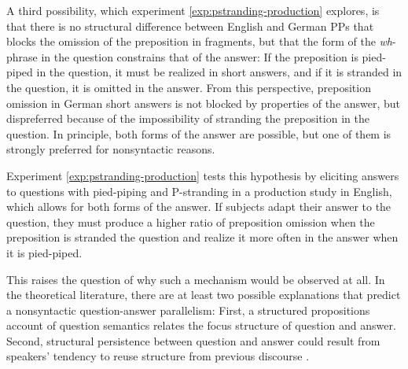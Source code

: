 A third possibility, which experiment \ref{exp:pstranding-production} explores, is that there is no structural difference between English and German PPs that blocks the omission of the preposition in fragments, but that the form of the \textit{wh}-phrase in the question constrains that of the answer: If the preposition is pied-piped in the question, it must be realized in short answers, and if it is stranded in the question, it is omitted in the answer. From this perspective, preposition omission in German short answers is not blocked by properties of the answer, but dispreferred because of the impossibility of stranding the preposition in the question. In principle, both forms of the answer are possible, but one of them is strongly preferred for nonsyntactic reasons.

\noindent Experiment \ref{exp:pstranding-production} tests this hypothesis by eliciting answers to questions with pied-piping and P-stranding in a production study in English, which allows for both forms of the answer. If subjects adapt their answer to the question, they must produce a higher ratio of preposition omission when the preposition is stranded the question and realize it more often in the answer when it is pied-piped.

This raises the question of why such a mechanism would be observed at all. In the theoretical literature, there are at least two possible explanations that predict a nonsyntactic question-answer parallelism: First, a structured propositions account of question semantics \citep{vonstechow1981, reich2002a} relates the focus structure of question and answer. Second, structural persistence \citep{nykiel2017} between question and answer could result from speakers' tendency to reuse structure from previous discourse \citep{levelt.kelter1982, nykiel2017}. 

\label{sec:psg-alternatives-structured}\largerpage[-1]

